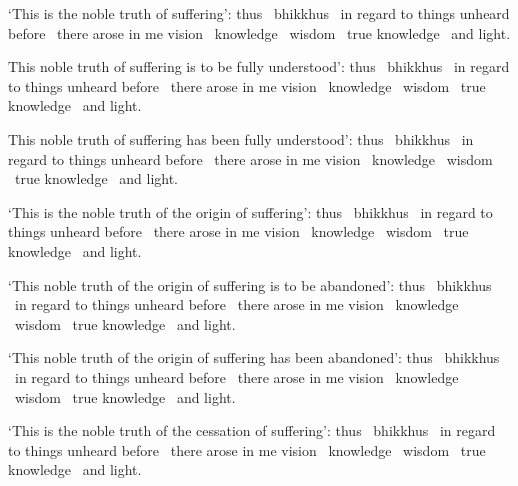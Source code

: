 \begin{english-hang}
`This is the noble truth of suffering': thus \breathmark\ bhikkhus \breathmark\ in regard to things unheard before \breathmark\ there arose in me vision \breathmark\ knowledge \breathmark\ wisdom \breathmark\ true knowledge \breathmark\ and light.
\end{english-hang}

\begin{english-hang}
This noble truth of suffering is to be fully understood': thus \breathmark\ bhikkhus \breathmark\ in regard to things unheard before \breathmark\ there arose in me vision \breathmark\ knowledge \breathmark\ wisdom \breathmark\ true knowledge \breathmark\ and light.
\end{english-hang}

\begin{english-hang}
This noble truth of suffering has been fully understood': thus \breathmark\ bhikkhus \breathmark\ in regard to things unheard before \breathmark\ there arose in me vision \breathmark\ knowledge \breathmark\ wisdom \breathmark\ true knowledge \breathmark\ and light.
\end{english-hang}

\begin{english-hang}
`This is the noble truth of the origin of suffering': thus \breathmark\ bhikkhus \breathmark\ in regard to things unheard before \breathmark\ there arose in me vision \breathmark\ knowledge \breathmark\ wisdom \breathmark\ true knowledge \breathmark\ and light.
\end{english-hang}

\begin{english-hang}
`This noble truth of the origin of suffering is to be abandoned': thus \breathmark\ bhikkhus \breathmark\ in regard to things unheard before \breathmark\ there arose in me vision \breathmark\ knowledge \breathmark\ wisdom \breathmark\ true knowledge \breathmark\ and light.
\end{english-hang}

\begin{english-hang}
`This noble truth of the origin of suffering has been abandoned': thus \breathmark\ bhikkhus \breathmark\ in regard to things unheard before \breathmark\ there arose in me vision \breathmark\ knowledge \breathmark\ wisdom \breathmark\ true knowledge \breathmark\ and light.
\end{english-hang}

\begin{english-hang}
`This is the noble truth of the cessation of suffering': thus \breathmark\ bhikkhus \breathmark\ in regard to things unheard before \breathmark\ there arose in me vision \breathmark\ knowledge \breathmark\ wisdom \breathmark\ true knowledge \breathmark\ and light.
\end{english-hang}

